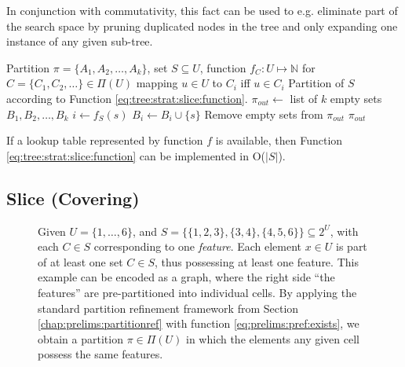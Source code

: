 			In conjunction with commutativity, this fact can be used to e.g. eliminate part of the search space by pruning duplicated nodes in the tree and only expanding one instance of any given sub-tree.
		
			\begin{algorithm}[ht!]
				\centering
				\begin{algorithmic}
					\Require Partition $\pi = \{ A_1, A_2, \ldots, A_k \}$, set $S \subseteq U$, function $f_C: U \mapsto \mathbb{N}$ for $C = \{ C_1, C_2, \ldots \} \in \Pi(U)$ mapping $u \in U$ to $C_i$ iff $u \in C_i$
					\Ensure Partition of $S$ according to Function \ref{eq:tree:strat:slice:function}.
					\Statex
						\State $\pi_{out} \gets$ list of $k$ empty sets $B_1, B_2, \ldots, B_k$
							\State $i \gets f_S(s)$
							\State $B_i \gets B_i \cup \{ s \}$
						\EndFor
						\State Remove empty sets from $\pi_{out}$
						\State \Return $\pi_{out}$
					\EndFunction
				\end{algorithmic}
				\caption{If a lookup table represented by function $f$ is available, then Function \ref{eq:tree:strat:slice:function} can be implemented in O($|S|$).}
				\label{algo:tree:strat:slice}
			\end{algorithm}
			
			\FloatBarrier
			\clearpage
		
		\subsection{Slice (Covering)}
		
			\begin{figure}[ht!]
				\centering
				
				\caption{Given $U = \{ 1, \ldots, 6 \}$, and $S = \{ \{ 1, 2, 3 \}, \{ 3, 4 \}, \{ 4, 5, 6 \} \} \subseteq 2^U$, with each $C \in S$ corresponding to one \textit{feature}.
				Each element $x \in U$ is part of at least one set $C \in S$, thus possessing at least one feature.
				This example can be encoded as a graph, where the right side \enquote{the features} are pre-partitioned into individual cells. By applying the standard partition refinement framework from Section \ref{chap:prelims:partitionref} with function \ref{eq:prelims:pref:exists}, we obtain a partition $\pi \in \Pi(U)$ in which the elements any given cell possess the same features.} 
				\label{fig:tree:strat:cov}
			\end{figure}
			
